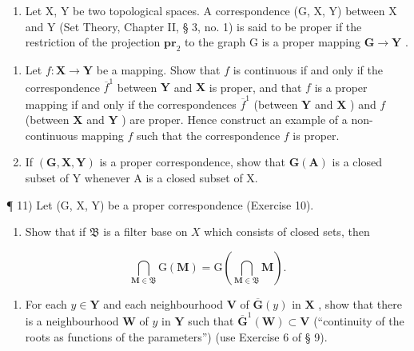 \begin{enumerate}
\def\labelenumi{\arabic{enumi})}
\setcounter{enumi}{9}
\tightlist
\item
  Let X, Y be two topological spaces. A correspondence (G, X, Y) between X and Y (Set Theory, Chapter II, § 3, no. 1) is said to be proper if the restriction of the projection \(\mathbf{pr}_2\) to the graph G is a proper mapping \(\mathbf{G} \to \mathbf{Y}\) .
\end{enumerate}

\begin{enumerate}
\def\labelenumi{\alph{enumi})}
\item
  Let \(f: \mathbf{X} \to \mathbf{Y}\) be a mapping. Show that \(f\) is continuous if and only if the correspondence \(\overline{f}^1\) between \(\mathbf{Y}\) and \(\mathbf{X}\) is proper, and that \(f\) is a proper mapping if and only if the correspondences \(\overline{f}^1\) (between \(\mathbf{Y}\) and \(\mathbf{X}\) ) and \(f\) (between \(\mathbf{X}\) and \(\mathbf{Y}\) ) are proper. Hence construct an example of a non-continuous mapping \(f\) such that the correspondence \(f\) is proper.
\item
  If \((\mathbf{G}, \mathbf{X}, \mathbf{Y})\) is a proper correspondence, show that \(\mathbf{G}(\mathbf{A})\) is a closed subset of Y whenever A is a closed subset of X.
\end{enumerate}

¶ 11) Let (G, X, Y) be a proper correspondence (Exercise 10).

\begin{enumerate}
\def\labelenumi{\alph{enumi})}
\tightlist
\item
  Show that if \(\mathfrak{B}\) is a filter base on \(X\) which consists of closed sets, then
\end{enumerate}

\[
\bigcap_ {\mathbf {M} \in \mathfrak {B}} \mathrm{G} (\mathbf {M}) = \mathrm{G} \left(\bigcap_ {\mathbf {M} \in \mathfrak {B}} \mathbf {M}\right).
\]

\begin{enumerate}
\def\labelenumi{\alph{enumi})}
\setcounter{enumi}{1}
\tightlist
\item
  For each \(y \in \mathbf{Y}\) and each neighbourhood \(\mathbf{V}\) of \(\overline{\mathbf{G}}(y)\) in \(\mathbf{X}\) , show that there is a neighbourhood \(\mathbf{W}\) of \(y\) in \(\mathbf{Y}\) such that \(\overline{\mathbf{G}}^{1}(\mathbf{W}) \subset \mathbf{V}\) (``continuity of the roots as functions of the parameters'') (use Exercise 6 of § 9).
\end{enumerate}

